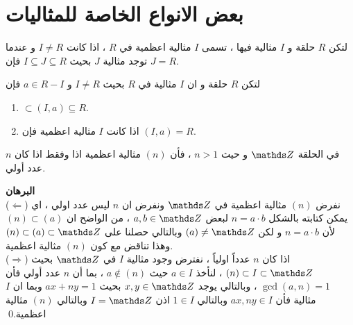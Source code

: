  \setRL
 \section{بعض الانواع الخاصة للمثاليات}
 
 \begin{definition}
 	لتكن $R$ حلقة و $I$ مثالية فيها ، تسمى $I$ مثالية اعظمية في $R$ ، اذا كانت $I\neq R$ و عندما توجد مثالية $J$ بحيث 
 	$I \subseteq J \subseteq R$ فإن $J=R$.
 \end{definition}
 
 \begin{note}
 	لتكن $R$ حلقة و ان $I$ مثالية في $R$ بحيث  $I\neq R$ و $a\in R - I$ فإن
 	\begin{enumerate}
 		\item $\subset (I, a) \subseteq R $.
 		\item  اذا كانت $I$ مثالية اعظمية فإن $(I, a) = R$.
 	\end{enumerate}
 \end{note}
 
 \begin{theorem}
 	في الحلقة $\Z$ و حيث $n>1$ ، فأن $(n)$ مثالية اعظمية اذا وفقط اذا كان $n$ عدد أولي.
 \end{theorem}
 
 \noindent
 \textbf{البرهان}\\
 \noindent
 ($\Leftarrow$) نفرض $(n)$ مثالية اعظمية في $\Z$ ونفرض ان $n$ ليس عدد اولي ، اي يمكن كتابته بالشكل $n=a\cdot b$ لبعض $a, b\in \Z$ ، من الواضح ان $(n) \subset (a)$ لأن $n=a\cdot b$ و لكن $(a)\neq \Z$ وبالتالي حصلنا على $(n) \subset (a) \subset \Z$ وهذا تناقض مع كون $(n)$ مثالية اعظمية.\\
 ($\Rightarrow$) اذا كان $n$ عدداً اولياً ، نفترض وجود مثالية $I$ في $\Z$ بحيث $(n )\subset I \subset \Z$ ، لنأخذ $a\in I$ حيث $a\notin (n)$ ، بما أن $n$  عدد أولي فأن $\gcd(a, n) = 1$ ، وبالتالي يوجد $x, y\in \Z$ بحيث $ax + ny=1$ وبما ان $I$ مثالية فأن $ax, ny\in I$ وبالتالي $1\in I$ اذن $I = \Z$ وبالتالي $(n)$ مثالية اعظمية.\qed  
 
 
